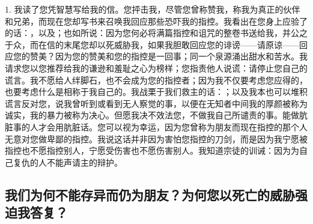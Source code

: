 1. 我读了您凭智慧写给我的信。您抨击我，尽管您曾称赞我，称我为真正的伙伴和兄弟，而现在您却写书来召唤我回应那些恐吓我的指控。我看出在您身上应验了的话：，以及；也如所说：因为您何必将满篇指控和诅咒的整卷书送给我，并公之于众，而在信的末尾您却以死威胁我，如果我胆敢回应您的诽谤——请原谅——回应您的赞美？因为您的赞美和您的指控是一回事；同一个泉源涌出甜水和苦水。我请求您以您推荐给我的谦逊和羞耻之心为榜样；您指责他人说谎：请停止您自己的谎言。我不愿给人绊脚石，也不会成为您的指控者；因为我不仅要考虑您应得的，也要考虑什么是相称于我自己的。我战栗于我们救主的话：；以及我本也可以堆积谎言反对您，说我曾听到或看到无人察觉的事，以便在无知者中间我的厚颜被称为诚实，我的暴力被称为决心。但愿我决不效法您，不做我自己所谴责的事。能做肮脏事的人才会用肮脏话。您可以视为幸运，因为您曾称为朋友而现在指控的那个人无意对您做卑鄙的指控。我说这话并非因为害怕您指控的刀剑，而是因为我宁愿被指控也不愿指控别人，宁愿受伤害也不愿伤害别人。我知道宗徒的训诫：因为为自己复仇的人不能声请主的辩护。\par


\subsection{我们为何不能存异而仍为朋友？为何您以死亡的威胁强迫我答复？}


